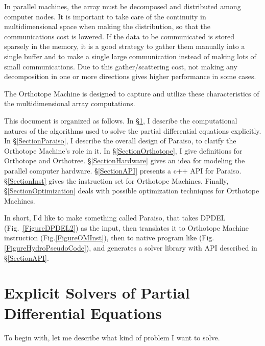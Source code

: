 \documentclass[twocolumn]{article}
\begin{document}
In parallel machines, the array must be decomposed and distributed among
computer nodes. It is important to take care of the continuity in
multidimensional space when making the distribution, so that the
communications cost is lowered. If the data to be communicated is stored
sparsely in the memory, it is a good strategy to gather them manually into a
single buffer and to make a single large communication instead of making lots
of small communications. Due to this gather/scattering cost, not making any
decomposition in one or more directions gives higher performance in some
cases.

The Orthotope Machine is designed to capture and utilize these
characteristics of the multidimensional array computations.

This document is organized as follows.  In \S\ref{SectionPDE}, I describe the
computational natures of the algorithms used to solve the partial differential
equations explicitly. In \S\ref{SectionParaiso}, I describe the overall design
of Paraiso, to clarify the Orthotope Machine's role in it. In
\S\ref{SectionOrthotope}, I give definitions for Orthotope and
Orthotree. \S\ref{SectionHardware} gives an idea for modeling the parallel
computer hardware. \S\ref{SectionAPI} presents a c++ API for
Paraiso. \S\ref{SectionInst} gives the instruction set for Orthotope
Machines. Finally, \S\ref{SectionOptimization} deals with possible
optimization techniques for Orthotope Machines.

In short, I'd like to make something called Paraiso, that takes DPDEL
(Fig.~\ref{FigureDPDEL2}) as the input, then translates it to Orthotope
Machine instruction (Fig.\ref{FigureOMInst}), then to native program like
(Fig.\ref{FigureHydroPseudoCode}), and generates a solver library with API
described in \S\ref{SectionAPI}.


\section{Explicit Solvers of Partial Differential Equations}
\label{SectionPDE}


To begin with, let me describe what kind of problem I want to solve.
\end{document}
